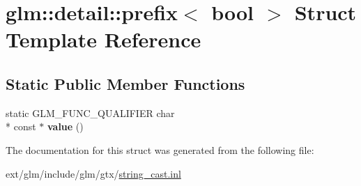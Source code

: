 \hypertarget{structglm_1_1detail_1_1prefix_3_01bool_01_4}{\section{glm\-:\-:detail\-:\-:prefix$<$ bool $>$ Struct Template Reference}
\label{structglm_1_1detail_1_1prefix_3_01bool_01_4}
}
\subsection*{Static Public Member Functions}
\begin{DoxyCompactItemize}
\item 
\hypertarget{structglm_1_1detail_1_1prefix_3_01bool_01_4_ab6d6392aa906c684f1abdda98830adad}{static G\-L\-M\-\_\-\-F\-U\-N\-C\-\_\-\-Q\-U\-A\-L\-I\-F\-I\-E\-R char \\*
const $\ast$ {\bfseries value} ()}\label{structglm_1_1detail_1_1prefix_3_01bool_01_4_ab6d6392aa906c684f1abdda98830adad}

\end{DoxyCompactItemize}


The documentation for this struct was generated from the following file\-:\begin{DoxyCompactItemize}
\item 
ext/glm/include/glm/gtx/\hyperlink{string__cast_8inl}{string\-\_\-cast.\-inl}\end{DoxyCompactItemize}
